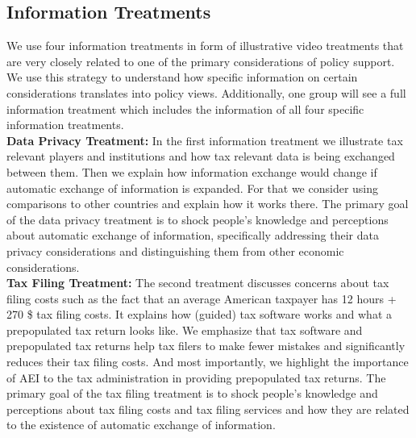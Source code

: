 \documentclass[11pt]{article}
\begin{document}
\subsection{Information Treatments}
We use four information treatments in form of illustrative video treatments that are very closely related to one of the primary considerations of policy support. We use this strategy to understand how specific information on certain considerations translates into policy views. Additionally, one group will see a full information treatment which includes the information of all four specific information treatments. \\[0.5em]
\textbf{Data Privacy Treatment:}
In the first information treatment we illustrate tax relevant players and institutions and how tax relevant data is being exchanged between them. Then we explain how information exchange would change if automatic exchange of information is expanded. For that we consider using comparisons to other countries and explain how it works there. The primary goal of the data privacy treatment is to shock people’s knowledge and perceptions about automatic exchange of information, specifically addressing their data privacy considerations and distinguishing them from other economic considerations. \\[0.5em]%
\textbf{Tax Filing Treatment:}
The second treatment discusses concerns about tax filing costs such as the fact that an average American taxpayer has 12 hours + 270 \$ tax filing costs. It explains how (guided) tax software works and what a prepopulated tax return looks like. We emphasize that tax software and prepopulated tax returns help tax filers to make fewer mistakes and significantly reduces their tax filing costs. And most importantly, we highlight the importance of AEI to the tax administration in providing prepopulated tax returns. The primary goal of the tax filing treatment is to shock people's knowledge and perceptions about tax filing costs and tax filing services and how they are related to the existence of automatic exchange of information. \\[0.5em]%
\end{document}
